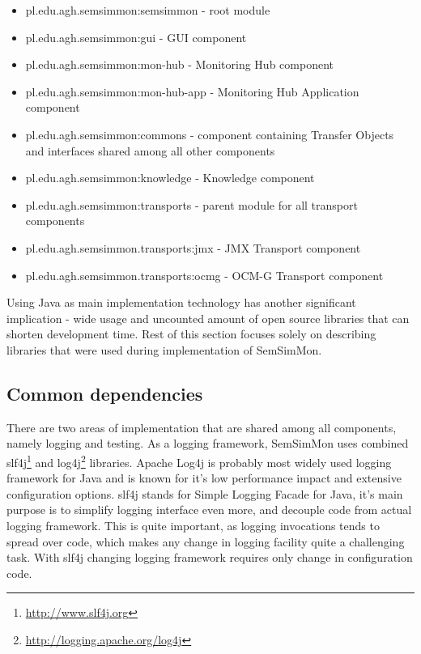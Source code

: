  
\begin{itemize}
 \item pl.edu.agh.semsimmon:semsimmon - root module
 \item pl.edu.agh.semsimmon:gui - GUI component
 \item pl.edu.agh.semsimmon:mon-hub - Monitoring Hub component
 \item pl.edu.agh.semsimmon:mon-hub-app - Monitoring Hub Application component 
 \item pl.edu.agh.semsimmon:commons - component containing Transfer Objects and interfaces shared among all other
components
 \item pl.edu.agh.semsimmon:knowledge - Knowledge component
 \item pl.edu.agh.semsimmon:transports - parent module for all transport components
 \item pl.edu.agh.semsimmon.transports:jmx - JMX Transport component
 \item pl.edu.agh.semsimmon.transports:ocmg - OCM-G Transport component
\end{itemize}


Using Java as main implementation technology has another significant implication - wide usage and uncounted amount of
open source libraries that can shorten development time. Rest of this section focuses solely on describing libraries
that were used during implementation of SemSimMon.



\subsection{Common dependencies}

There are two areas of implementation that are shared among all components, namely logging and testing. As a logging
framework, SemSimMon uses combined slf4j\footnote{\url{http://www.slf4j.org}} and
log4j\footnote{\url{http://logging.apache.org/log4j}} libraries. Apache Log4j is probably most widely used logging
framework for Java and is known for it's low performance impact and extensive configuration options. slf4j stands for
Simple Logging Facade for Java, it's main purpose is to simplify logging interface even more, and decouple code from
actual logging framework. This is quite important, as logging invocations tends to spread over code, which makes any
change in logging facility quite a challenging task. With slf4j changing logging framework requires only change in
configuration code.

